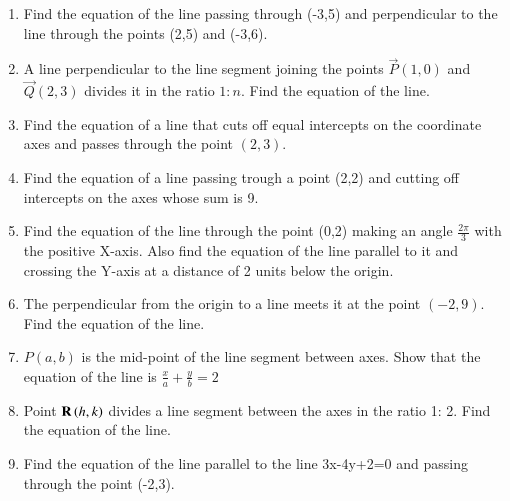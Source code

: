 \begin{enumerate}[label=\thesubsection.\arabic*,ref=\thesubsection.\theenumi]
\\
\solution

\item 
	Find the equation of the line passing through  (-3,5) and perpendicular to the line through the points (2,5) and (-3,6).
	\\
	\solution 
\label{chapters/11/10/2/10}

\item 
A line perpendicular to the line segment joining the points $\vec{P}(1,0)$ and $\vec{Q}(2,3)$ divides it in the ratio $1:n$. Find the equation of the line.
	\\
	\solution 
\label{chapters/11/10/2/11}

\item Find the equation of a line that cuts off equal intercepts on the coordinate axes and passes through the point $(2,3)$.  
	\\
\solution 
\label{chapters/11/10/2/12}

\item 
Find the equation of a line passing trough a point (2,2) and cutting off intercepts on the axes whose sum is 9.
	\\
	\solution 
\label{chapters/11/10/2/13}

\item 
	Find the equation of the line through the point (0,2) making an angle $\frac{2\pi}{3}$ with the positive X-axis. Also find the equation of the line parallel to it and crossing the Y-axis at a distance of 2 units below the origin.
	\\
	\solution
\label{chapters/11/10/2/14}

\item 
	The perpendicular from the origin to a line meets it at the point $(-2,9)$. Find the equation of the line.
\label{chapters/11/10/2/15}
	\\
	\solution

\item 
$P(a,b)$ is the mid-point of the line segment between axes. Show that the equation of the line is $\frac{x}{a}+\frac{y}{b}=2$
\label{chapters/11/10/2/18}
\\
\solution

\item Point $\mathbf{R}\left(h, k\right)$ divides a line segment between the axes in the ratio 1: 2. Find the equation of the line.
\label{chapters/11/10/2/19}
	\\
	\solution 

\item Find the equation of the line  parallel to the line 3x-4y+2=0 and passing through the point (-2,3).

\end{enumerate}
